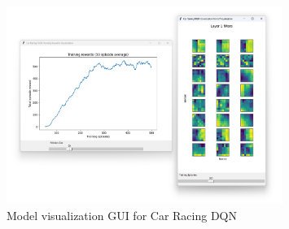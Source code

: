 \begin{figure}[H]
  \centering
  \includegraphics[width=0.8\textwidth]{figures/images/car_racing_gui.png}
  \caption[Car Racing DQN model visualization GUI]{Model visualization GUI for Car Racing DQN}
  \label{fig:car_racing_gui}
\end{figure}
